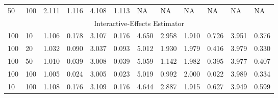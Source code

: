 \documentclass[a4paper]{article}
\begin{document}
\begin{table}[]
\begin{threeparttable}
\begin{tabular}{llllllllllll}
50  & 100 & 2.111                                                        & 1.116 & 4.108                                                        & 1.113 & NA                                                       & NA    & NA                                                          & NA    & NA                                                          & NA    \\
\multicolumn{12}{c}{Interactive-Effects Estimator}                                                                                                                                                                                                                                                                                                                     \\
100 & 10  & 1.106                                                        & 0.178 & 3.107                                                        & 0.176 & 4.650                                                    & 2.958 & 1.910                                                       & 0.726 & 3.951                                                       & 0.376 \\
100 & 20  & 1.032                                                        & 0.090 & 3.037                                                        & 0.093 & 5.012                                                    & 1.930 & 1.979                                                       & 0.416 & 3.979                                                       & 0.330 \\
100 & 50  & 1.010                                                        & 0.039 & 3.008                                                        & 0.039 & 5.059                                                    & 1.142 & 1.982                                                       & 0.395 & 3.977                                                       & 0.407 \\
100 & 100 & 1.005                                                        & 0.024 & 3.005                                                        & 0.023 & 5.019                                                    & 0.992 & 2.000                                                       & 0.022 & 3.989                                                       & 0.334 \\
10  & 100 & 1.108                                                        & 0.176 & 3.109                                                        & 0.176 & 4.644                                                    & 2.887 & 1.915                                                       & 0.627 & 3.949                                                       & 0.599 \\

\end{tabular}
\end{threeparttable}
\end{table}
\end{document}
